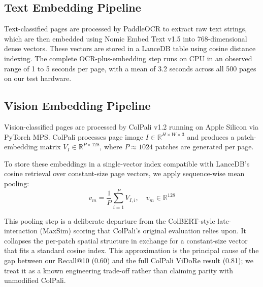 \documentclass[conference]{IEEEtran}
\begin{document}
\subsection{Text Embedding Pipeline}
Text-classified pages are processed by PaddleOCR \cite{paddleocr2020} to extract raw text strings, which are then embedded using Nomic Embed Text v1.5 \cite{nussbaum2024nomic} into 768-dimensional dense vectors. These vectors are stored in a LanceDB \cite{lancedb2024} table using cosine distance indexing. The complete OCR-plus-embedding step runs on CPU in an observed range of 1 to 5 seconds per page, with a mean of 3.2 seconds across all 500 pages on our test hardware.
 
\subsection{Vision Embedding Pipeline}
Vision-classified pages are processed by ColPali v1.2 \cite{faysse2024colpali} running on Apple Silicon via PyTorch MPS. ColPali processes page image $I \in \mathbb{R}^{H \times W \times 3}$ and produces a patch-embedding matrix $V_I \in \mathbb{R}^{P \times 128}$, where $P \approx 1024$ patches are generated per page.
 
To store these embeddings in a single-vector index compatible with LanceDB's cosine retrieval over constant-size page vectors, we apply sequence-wise mean pooling:
\begin{equation}
v_m = \frac{1}{P} \sum_{i=1}^{P} V_{I,i}, \quad v_m \in \mathbb{R}^{128}
\end{equation}
 
This pooling step is a deliberate departure from the ColBERT-style \cite{khattab2020colbert} late-interaction (MaxSim) scoring that ColPali's original evaluation relies upon. It collapses the per-patch spatial structure in exchange for a constant-size vector that fits a standard cosine index. This approximation is the principal cause of the gap between our Recall@10 (0.60) and the full ColPali ViDoRe result (0.81); we treat it as a known engineering trade-off rather than claiming parity with unmodified ColPali.
 
\end{document}
